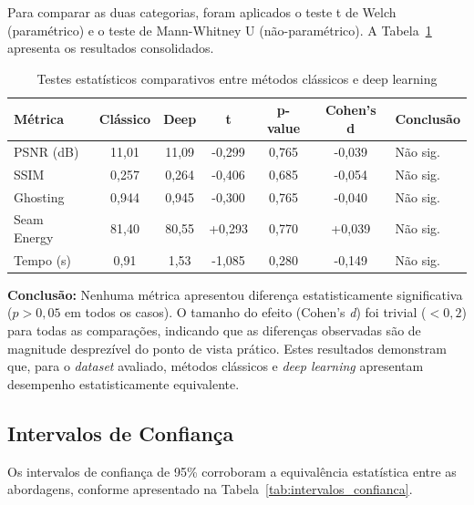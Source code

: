 Para comparar as duas categorias, foram aplicados o teste t de Welch (paramétrico) e o teste de Mann-Whitney U (não-paramétrico). A Tabela~\ref{tab:testes_comparativos} apresenta os resultados consolidados.

\begin{table}[htb]
\centering
\caption{Testes estatísticos comparativos entre métodos clássicos e deep learning}
\label{tab:testes_comparativos}
\small
\begin{tabular}{lcccccl}
\hline
\textbf{Métrica} & \textbf{Clássico} & \textbf{Deep} & \textbf{t} & \textbf{p-value} & \textbf{Cohen's d} & \textbf{Conclusão} \\ \hline
PSNR (dB) & 11,01 & 11,09 & -0,299 & 0,765 & -0,039 & Não sig. \\
SSIM & 0,257 & 0,264 & -0,406 & 0,685 & -0,054 & Não sig. \\
Ghosting & 0,944 & 0,945 & -0,300 & 0,765 & -0,040 & Não sig. \\
Seam Energy & 81,40 & 80,55 & +0,293 & 0,770 & +0,039 & Não sig. \\
Tempo (s) & 0,91 & 1,53 & -1,085 & 0,280 & -0,149 & Não sig. \\
\hline
\end{tabular}
\end{table}

\textbf{Conclusão:} Nenhuma métrica apresentou diferença estatisticamente significativa ($p>0{,}05$ em todos os casos). O tamanho do efeito (Cohen's \textit{d}) foi trivial ($<0{,}2$) para todas as comparações, indicando que as diferenças observadas são de magnitude desprezível do ponto de vista prático. Estes resultados demonstram que, para o \textit{dataset} avaliado, métodos clássicos e \textit{deep learning} apresentam desempenho estatisticamente equivalente.

\subsection{Intervalos de Confiança}

Os intervalos de confiança de 95\% corroboram a equivalência estatística entre as abordagens, conforme apresentado na Tabela~\ref{tab:intervalos_confianca}.

